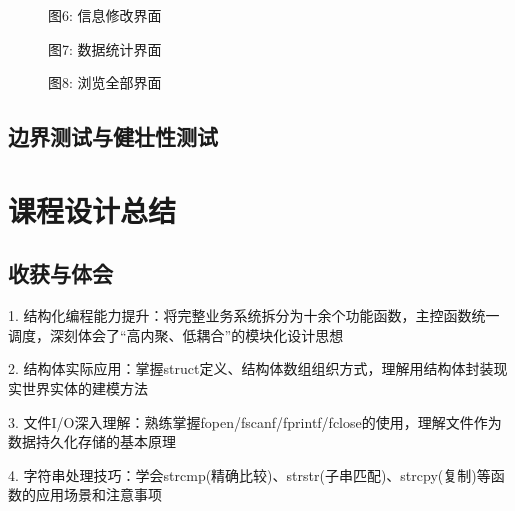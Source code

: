 \begin{figure}[H]
  \centering
  \caption{图6: 信息修改界面}
\end{figure}


\begin{figure}[H]
  \centering
  \caption{图7: 数据统计界面}
\end{figure}


\begin{figure}[H]
  \centering
  \caption{图8: 浏览全部界面}
\end{figure}


\subsection{边界测试与健壮性测试}
\section{课程设计总结}
\subsection{收获与体会}
1. 结构化编程能力提升：将完整业务系统拆分为十余个功能函数，主控函数统一调度，深刻体会了“高内聚、低耦合”的模块化设计思想

2. 结构体实际应用：掌握struct定义、结构体数组组织方式，理解用结构体封装现实世界实体的建模方法

3. 文件I/O深入理解：熟练掌握fopen/fscanf/fprintf/fclose的使用，理解文件作为数据持久化存储的基本原理

4. 字符串处理技巧：学会strcmp(精确比较)、strstr(子串匹配)、strcpy(复制)等函数的应用场景和注意事项

